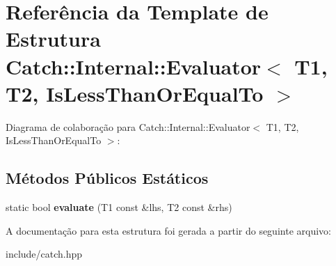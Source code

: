 \hypertarget{structCatch_1_1Internal_1_1Evaluator_3_01T1_00_01T2_00_01IsLessThanOrEqualTo_01_4}{}\section{Referência da Template de Estrutura Catch\+:\+:Internal\+:\+:Evaluator$<$ T1, T2, Is\+Less\+Than\+Or\+Equal\+To $>$}
\label{structCatch_1_1Internal_1_1Evaluator_3_01T1_00_01T2_00_01IsLessThanOrEqualTo_01_4}


Diagrama de colaboração para Catch\+:\+:Internal\+:\+:Evaluator$<$ T1, T2, Is\+Less\+Than\+Or\+Equal\+To $>$\+:
\subsection*{Métodos Públicos Estáticos}
\begin{DoxyCompactItemize}
\item 
static bool {\bfseries evaluate} (T1 const \&lhs, T2 const \&rhs)\hypertarget{structCatch_1_1Internal_1_1Evaluator_3_01T1_00_01T2_00_01IsLessThanOrEqualTo_01_4_adf269a597e4d82d69f29bcb516297b9b}{}\label{structCatch_1_1Internal_1_1Evaluator_3_01T1_00_01T2_00_01IsLessThanOrEqualTo_01_4_adf269a597e4d82d69f29bcb516297b9b}

\end{DoxyCompactItemize}


A documentação para esta estrutura foi gerada a partir do seguinte arquivo\+:\begin{DoxyCompactItemize}
\item 
include/catch.\+hpp\end{DoxyCompactItemize}
